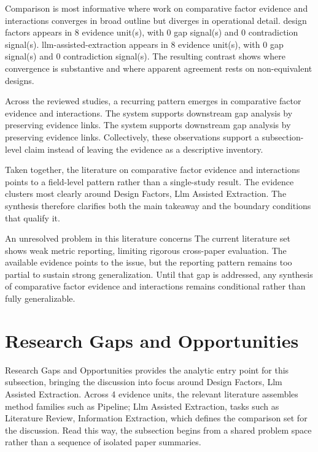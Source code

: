 \documentclass{article}
\begin{document}
Comparison is most informative where work on comparative factor evidence and interactions converges in broad outline but diverges in operational detail. design factors appears in 8 evidence unit(s), with 0 gap signal(s) and 0 contradiction signal(s). llm-assisted-extraction appears in 8 evidence unit(s), with 0 gap signal(s) and 0 contradiction signal(s). The resulting contrast shows where convergence is substantive and where apparent agreement rests on non-equivalent designs. \cite{08_2016_zhou_aap,17_2017_chen_aap,09_2018_jiang_aap}

Across the reviewed studies, a recurring pattern emerges in comparative factor evidence and interactions. The system supports downstream gap analysis by preserving evidence links. The system supports downstream gap analysis by preserving evidence links. Collectively, these observations support a subsection-level claim instead of leaving the evidence as a descriptive inventory. \cite{08_2016_zhou_aap,17_2017_chen_aap,09_2018_jiang_aap}

Taken together, the literature on comparative factor evidence and interactions points to a field-level pattern rather than a single-study result. The evidence clusters most clearly around Design Factors, Llm Assisted Extraction. The synthesis therefore clarifies both the main takeaway and the boundary conditions that qualify it. \cite{08_2016_zhou_aap,17_2017_chen_aap}

An unresolved problem in this literature concerns The current literature set shows weak metric reporting, limiting rigorous cross-paper evaluation. The available evidence points to the issue, but the reporting pattern remains too partial to sustain strong generalization. Until that gap is addressed, any synthesis of comparative factor evidence and interactions remains conditional rather than fully generalizable. \cite{08_2016_zhou_aap,17_2017_chen_aap}

\section{Research Gaps and Opportunities}
Research Gaps and Opportunities provides the analytic entry point for this subsection, bringing the discussion into focus around Design Factors, Llm Assisted Extraction. Across 4 evidence units, the relevant literature assembles method families such as Pipeline; Llm Assisted Extraction, tasks such as Literature Review, Information Extraction, which defines the comparison set for the discussion. Read this way, the subsection begins from a shared problem space rather than a sequence of isolated paper summaries. \cite{08_2016_zhou_aap,09_2018_jiang_aap}
\end{document}
